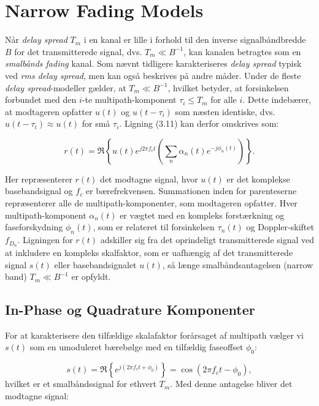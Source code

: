 \documentclass[a4paper,12pt]{book}
\begin{document}
	\clearpage
	
	
	\section{Narrow Fading Models}
	Når \textit{delay spread} \( T_m \) i en kanal er lille i forhold til den inverse signalbåndbredde \( B \) for det transmitterede signal, dvs. \( T_m \ll B^{-1} \), kan kanalen betragtes som en \textit{smalbånds fading} kanal. Som nævnt tidligere karakteriseres \textit{delay spread} typisk ved \textit{rms delay spread}, men kan også beskrives på andre måder. Under de fleste \textit{delay spread}-modeller gælder, at \( T_m \ll B^{-1} \), hvilket betyder, at forsinkelsen forbundet med den \( i \)-te multipath-komponent \( \tau_i \leq T_m \) for alle \( i \). Dette indebærer, at modtageren opfatter \( u(t) \) og \( u(t - \tau_i) \) som næsten identiske, dvs. \( u(t - \tau_i) \approx u(t) \) for små \( \tau_i \). Ligning (3.11) kan derfor omskrives som:
	
	\[
	r(t) = \Re \left\{ u(t) e^{j 2 \pi f_c t} \left( \sum_n \alpha_n(t) e^{-j \phi_n(t)} \right) \right\}.
	\]
	
	Her repræsenterer \( r(t) \) det modtagne signal, hvor \( u(t) \) er det komplekse basebandsignal og \( f_c \) er bærefrekvensen. Summationen inden for parenteserne repræsenterer alle de multipath-komponenter, som modtageren opfatter. Hver multipath-komponent \( \alpha_n(t) \) er vægtet med en kompleks forstærkning og faseforskydning \( \phi_n(t) \), som er relateret til forsinkelsen \( \tau_n(t) \) og Doppler-skiftet \( f_{D_n} \). 
	\newline\newline
	Ligningen for \(r(t)\) adskiller sig fra det oprindeligt transmitterede signal ved at inkludere en kompleks skalfaktor, som er uafhængig af det transmitterede signal \( s(t) \) eller basebandsignalet \( u(t) \), så længe smalbåndsantagelsen (narrow band) \( T_m \ll B^{-1} \) er opfyldt.
	
	\subsection{In-Phase og Quadrature Komponenter}
	For at karakterisere den tilfældige skalafaktor forårsaget af multipath vælger vi \( s(t) \) som en umoduleret bærebølge med en tilfældig faseoffset \( \phi_0 \):
	
	\[
	s(t) = \Re \left\{ e^{j \left( 2 \pi f_c t + \phi_0 \right)} \right\} = \cos \left( 2 \pi f_c t - \phi_0 \right),
	\]
	\noindent
	hvilket er et smalbåndssignal for ethvert \( T_m \).
	\newline\newline\noindent
	Med denne antagelse bliver det modtagne signal:
	
\end{document}
